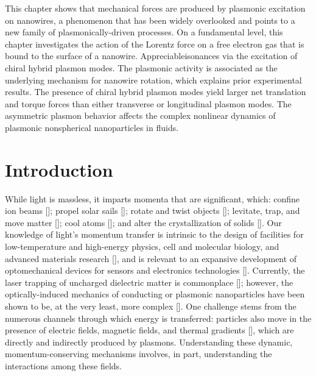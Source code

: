 This chapter shows that mechanical forces are produced by plasmonic excitation on nanowires, a phenomenon that has been widely overlooked and points to a new family of plasmonically-driven processes. On a fundamental level, this chapter investigates the action of the Lorentz force on a free electron gas that is bound to the surface of a nanowire. Appreciableisonances via the excitation of chiral hybrid plasmon modes. The plasmonic activity is associated as the underlying mechanism for nanowire rotation, which explains prior experimental results. The presence of chiral hybrid plasmon modes yield larger net translation and torque forces than either transverse or longitudinal plasmon modes. The asymmetric plasmon behavior affects the complex nonlinear dynamics of plasmonic nonspherical nanoparticles in fluids.

\section{Introduction}
While light is massless, it imparts momenta that are significant, which: confine ion beams [\cite{Petrich1993}]; propel solar sails [\cite{Janhunen2007}]; rotate and twist objects [\cite{Beth1936, Paterson2001, Tsai2014}]; levitate, trap, and move matter [\cite{Laboratories1997, NieminenRev, Novotny1997}]; cool atoms [\cite{Weiner1999}]; and alter the crystallization of solids [\cite{Chowdhury1985}]. Our knowledge of light's momentum transfer is intrinsic to the design of facilities for low-temperature and high-energy physics, cell and molecular biology, and advanced materials research [\cite{Laboratories1997}], and is relevant to an expansive development of optomechanical devices for sensors and electronics technologies [\cite{Hugel2002, Kippenberg2007, Thourhout2010}].  Currently, the laser trapping of uncharged dielectric matter is commonplace [\cite{Laboratories1997}]; however, the optically-induced mechanics of conducting or plasmonic nanoparticles have been shown to be, at the very least, more complex [\cite{Dienerowitz2008, Saija2009, Shvedov2010, Yan2012, Yan2012a, Yan2013, Yan2013a, Yan2013b}]. One challenge stems from the numerous channels through which energy is transferred: particles also move in the presence of electric fields, magnetic fields, and thermal gradients [\cite{Bhatt, Keshoju, Edwards2006}], which are directly and indirectly produced by plasmons.  Understanding these dynamic, momentum-conserving mechanisms involves, in part, understanding the interactions among these fields.


